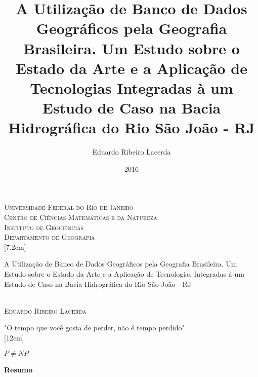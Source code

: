 \documentclass[12pt,a4paper,openany]{book} %
\title{A Utilização de Banco de Dados Geográficos pela Geografia Brasileira. Um Estudo sobre o Estado da Arte e a Aplicação de Tecnologias Integradas à um Estudo de Caso na Bacia Hidrográfica do Rio São João - RJ}
\author{Eduardo Ribeiro Lacerda}
\date{2016}
\begin{document}
	
	\begin{titlepage}
		
		\begin{center}
			\textsc{\large Universidade Federal do Rio de Janeiro} \\
			\textsc{\large Centro de Ciências Matemáticas e da Natureza} \\
			\textsc{\large Instituto de Geociências} \\
			\textsc{\large Departamento de Geografia} \\
			[7.2cm]
		\end{center}
		\Large{A Utilização de Banco de Dados Geográficos pela Geografia Brasileira. Um Estudo sobre o Estado da Arte e a Aplicação de Tecnologias Integradas à um Estudo de Caso na Bacia Hidrográfica do Rio São João - RJ} \\
		[6cm] \\
		\begin{flushright}
			\textsc{\large Eduardo Ribeiro Lacerda \\}
		\end{flushright} 
	\end{titlepage}
	
	
	\newpage
	\begin{center}
		\vspace*{\fill}
		"O tempo que você gosta de perder, não é tempo perdido" \\ 
		[12cm]
	\end{center}
	
	\newpage
	\begin{center}
		\vspace*{\fill}
		$ P \neq NP $ \\ 
		[12cm]
	\end{center}

	\tableofcontents
	\listoffigures
	
	\newpage
	\begin{center}
		\textbf{\LARGE Resumo}
	\end{center}
	
\end{document}
